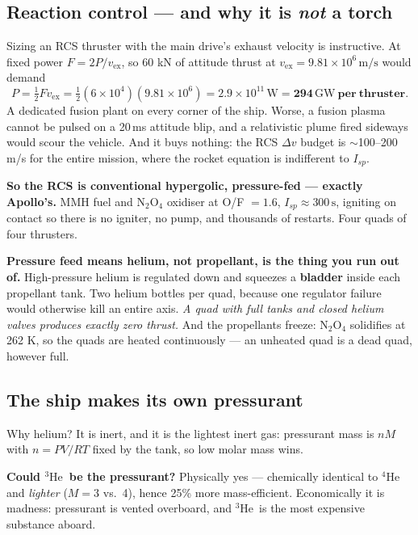 \documentclass[11pt]{article}
\newcommand{\ve}{v_{\text{ex}}}
\newcommand{\he}{\ensuremath{{}^3\mathrm{He}}}
\newcommand{\unit}[1]{\,\mathrm{#1}}
\begin{document}
\subsection{Reaction control --- and why it is \emph{not} a torch}
Sizing an RCS thruster with the main drive's exhaust velocity is instructive. At fixed power $F=2P/\ve$, so 60 kN of attitude thrust at $\ve=9.81\times10^{6}\unit{m/s}$ would demand
\begin{equation}
P=\tfrac12 F\ve = \tfrac12(6\times10^{4})(9.81\times10^{6}) = 2.9\times10^{11}\unit{W}
= \mathbf{294\unit{GW}\ per\ thruster.}
\end{equation}
A dedicated fusion plant on every corner of the ship. Worse, a fusion plasma cannot be pulsed on a 20\,ms attitude blip, and a relativistic plume fired sideways would scour the vehicle. And it buys nothing: the RCS $\Delta v$ budget is $\sim$100--200 m/s for the entire mission, where the rocket equation is indifferent to $I_{sp}$.

\textbf{So the RCS is conventional hypergolic, pressure-fed --- exactly Apollo's.} MMH fuel and N$_2$O$_4$ oxidiser at O/F $=1.6$, $I_{sp}\approx300\unit{s}$, igniting on contact so there is no igniter, no pump, and thousands of restarts. Four quads of four thrusters.

\textbf{Pressure feed means helium, not propellant, is the thing you run out of.} High-pressure helium is regulated down and squeezes a \textbf{bladder} inside each propellant tank. Two helium bottles per quad, because one regulator failure would otherwise kill an entire axis. \emph{A quad with full tanks and closed helium valves produces exactly zero thrust.} And the propellants freeze: N$_2$O$_4$ solidifies at 262 K, so the quads are heated continuously --- an unheated quad is a dead quad, however full.

\subsection{The ship makes its own pressurant}
Why helium? It is inert, and it is the lightest inert gas: pressurant mass is $nM$ with $n=PV/RT$ fixed by the tank, so low molar mass wins.

\textbf{Could \he\ be the pressurant?} Physically yes --- chemically identical to $^4$He and \emph{lighter} ($M=3$ vs.\ 4), hence 25\% more mass-efficient. Economically it is madness: pressurant is vented overboard, and \he\ is the most expensive substance aboard.
\end{document}

